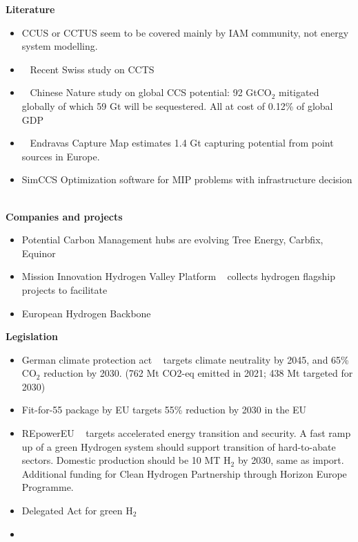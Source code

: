 \textbf{Literature}


\begin{itemize}
    \item CCUS or CCTUS seem to be covered mainly by IAM community, not energy system modelling.
    \item ~\cite{CaptureMapGetSitespecific} Recent Swiss study on CCTS
    \item ~\cite{weiProposedGlobalLayout2021} Chinese Nature study on global CCS potential: 92 GtCO$_2$ mitigated globally of which 59 Gt will be sequestered. All at cost of 0.12\% of global GDP
    \item ~\cite{ToolsGreenTransition} Endravas Capture Map estimates 1.4 Gt capturing potential from point sources in Europe.
    \item SimCCS Optimization software for MIP problems with infrastructure decision ~\cite{middletonSimCCSOpensourceTool2020}
\end{itemize}


\textbf{Companies and projects}
\begin{itemize}
    \item Potential Carbon Management hubs are evolving Tree Energy, Carbfix, Equinor
    \item Mission Innovation Hydrogen Valley Platform ~\cite{H2ValleysMissionInnovation} collects hydrogen flagship projects to facilitate
    \item European Hydrogen Backbone ~\cite{gasforclimateEuropeanHydrogenBackbone2022}
\end{itemize}


\textbf{Legislation}
\begin{itemize}
    \item German climate protection act ~\cite{KlimaschutzgesetzKlimaneutralitaetBis} targets climate neutrality by 2045, and 65\% CO$_2$ reduction by 2030. (762 Mt CO2-eq emitted in 2021; 438 Mt targeted for 2030)
    \item Fit-for-55 package by EU targets 55\% reduction by 2030 in the EU
    \item REpowerEU ~\cite{REPowerEU} targets accelerated energy transition and security. A fast ramp up of a green Hydrogen system should support transition of hard-to-abate sectors. Domestic production should be 10 MT H$_2$ by 2030, same as import. Additional funding for Clean Hydrogen Partnership through Horizon Europe Programme.
    \item Delegated Act for green H$_2$
    \item
\end{itemize}


